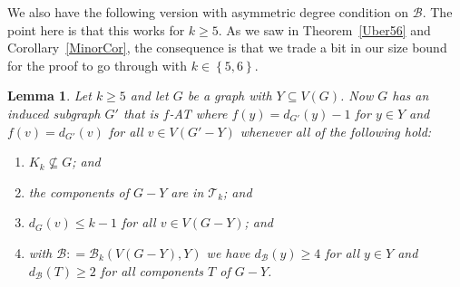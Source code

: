 \documentclass[12pt]{article}
\theoremstyle{plain}
\newtheorem{lem}[thm]{Lemma}
\theoremstyle{definition}
\theoremstyle{remark}
\newcommand{\fancy}[1]{\mathcal{#1}}
\newcommand{\T}{\fancy{T}}
\newcommand{\B}{\fancy{B}}
\newcommand{\set}[1]{\left\{ #1 \right\}}
\newcommand{\DefinedAs}{\mathrel{\mathop:}=}
\begin{document}
We also have the following version with asymmetric degree condition on $\B$. 
The point here is that this works for $k \ge 5$.  As we saw in
Theorem~\ref{Uber56} and Corollary~\ref{MinorCor}, the consequence is that we
trade a bit in our size bound for the proof to go through with $k \in
\set{5,6}$.

\begin{lem}
\label{MultipleHighConfigurationEulerLopsided} 
Let $k \ge 5$ and let $G$ be a graph with $Y\subseteq V(G)$.  Now $G$ has an induced
subgraph $G'$ that is $f$-AT where $f(y)=d_{G'}(y)-1$ for $y\in Y$ and
$f(v)=d_{G'}(v)$ for all $v\in V(G'-Y)$ whenever all of the following hold:
	\begin{enumerate}
	\item[(1)] $K_{k}\not\subseteq G$; and 
	\item[(2)] the components of $G-Y$ are in $\T_{k}$; and 
	\item[(3)] $d_{G}(v)\leq k-1$ for all $v\in V(G-Y)$; and 
	\item[(4)] with $\B \DefinedAs \B_k(V(G-Y), Y)$ we have $d_{\B}(y) \ge 4$ for all $y \in Y$ and $d_{\B}(T) \ge 2$ for all components $T$ of $G-Y$.
	\end{enumerate}
\end{lem}





\end{document}
